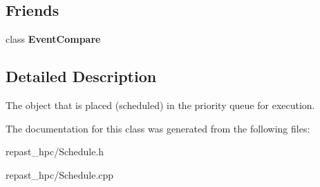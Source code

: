\subsection*{Friends}
\begin{DoxyCompactItemize}
\item 
\hypertarget{classrepast_1_1_scheduled_event_a13ca8575c9e8e7af0301158bc50424a2}{class {\bfseries Event\-Compare}}\label{classrepast_1_1_scheduled_event_a13ca8575c9e8e7af0301158bc50424a2}

\end{DoxyCompactItemize}


\subsection{Detailed Description}
The object that is placed (scheduled) in the priority queue for execution. 

The documentation for this class was generated from the following files\-:\begin{DoxyCompactItemize}
\item 
repast\-\_\-hpc/Schedule.\-h\item 
repast\-\_\-hpc/Schedule.\-cpp\end{DoxyCompactItemize}
